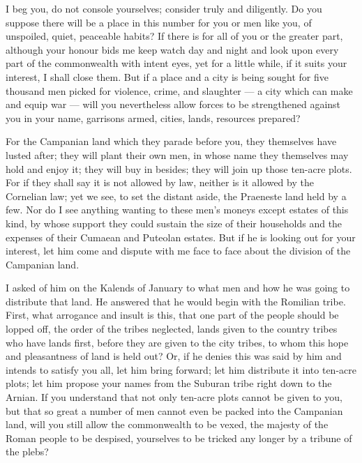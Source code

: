  I beg you, do not console yourselves; consider truly and diligently. Do you suppose there will be a place in this number for you or men like you, of unspoiled, quiet, peaceable habits? If there is for all of you or the greater part, although your honour bids me keep watch day and night and look upon every part of the commonwealth with intent eyes, yet for a little while, if it suits your interest, I shall close them. But if a place and a city is being sought for five thousand men picked for violence, crime, and slaughter --- a city which can make and equip war --- will you nevertheless allow forces to be strengthened against you in your name, garrisons armed, cities, lands, resources prepared?

 For the Campanian land which they parade before you, they themselves have lusted after; they will plant their own men, in whose name they themselves may hold and enjoy it; they will buy in besides; they will join up those ten-acre plots. For if they shall say it is not allowed by law, neither is it allowed by the Cornelian law; yet we see, to set the distant aside, the Praeneste land held by a few. Nor do I see anything wanting to these men's moneys except estates of this kind, by whose support they could sustain the size of their households and the expenses of their Cumaean and Puteolan estates. But if he is looking out for your interest, let him come and dispute with me face to face about the division of the Campanian land.

 I asked of him on the Kalends of January to what men and how he was going to distribute that land. He answered that he would begin with the Romilian tribe. First, what arrogance and insult is this, that one part of the people should be lopped off, the order of the tribes neglected, lands given to the country tribes who have lands first, before they are given to the city tribes, to whom this hope and pleasantness of land is held out? Or, if he denies this was said by him and intends to satisfy you all, let him bring forward; let him distribute it into ten-acre plots; let him propose your names from the Suburan tribe right down to the Arnian. If you understand that not only ten-acre plots cannot be given to you, but that so great a number of men cannot even be packed into the Campanian land, will you still allow the commonwealth to be vexed, the majesty of the Roman people to be despised, yourselves to be tricked any longer by a tribune of the plebs?

